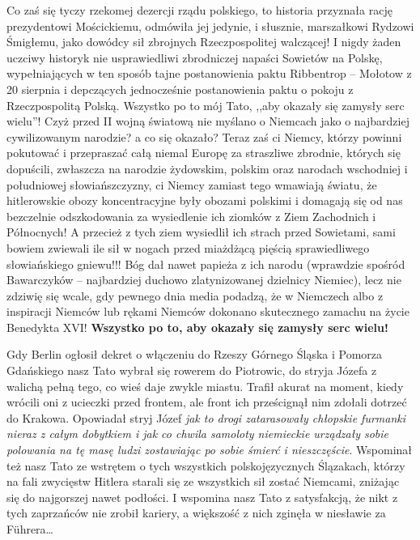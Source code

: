 Co zaś się tyczy rzekomej dezercji rządu polskiego, to historia przyznała rację prezydentowi Mościckiemu, odmówiła jej jedynie, i słusznie, marszałkowi Rydzowi Śmigłemu, jako dowódcy sił zbrojnych Rzeczpospolitej walczącej! I nigdy żaden uczciwy historyk nie usprawiedliwi zbrodniczej napaści Sowietów na Polskę, wypełniających w ten sposób tajne postanowienia paktu Ribbentrop -- Mołotow z 20 sierpnia i depczących jednocześnie postanowienia paktu o pokoju z Rzeczpospolitą Polską. Wszystko po to mój Tato, ,,aby okazały się zamysły serc wielu''! Czyż przed II wojną światową nie myślano o Niemcach jako o najbardziej cywilizowanym narodzie? a co się okazało? Teraz zaś ci Niemcy, którzy powinni pokutować i przepraszać całą niemal Europę za straszliwe zbrodnie, których się dopuścili, zwłaszcza na narodzie żydowskim, polskim oraz narodach wschodniej i południowej słowiańszczyzny, ci Niemcy zamiast tego wmawiają światu, że hitlerowskie obozy koncentracyjne były obozami polskimi i domagają się od nas bezczelnie odszkodowania za wysiedlenie ich ziomków z Ziem Zachodnich i Północnych! A przecież z tych ziem wysiedlił ich strach przed Sowietami, sami bowiem zwiewali ile sił w nogach przed miażdżącą pięścią sprawiedliwego słowiańskiego gniewu!!! Bóg dał nawet papieża z ich narodu (wprawdzie spośród Bawarczyków – najbardziej duchowo zlatynizowanej dzielnicy Niemiec), lecz nie zdziwię się wcale, gdy pewnego dnia media podadzą, że w Niemczech albo z inspiracji Niemców lub rękami Niemców dokonano skutecznego zamachu na życie Benedykta XVI! \textbf{Wszystko po to, aby okazały się zamysły serc wielu!}

Gdy Berlin ogłosił dekret o włączeniu do Rzeszy Górnego Śląska i Pomorza Gdańskiego nasz Tato wybrał się rowerem do Piotrowic, do stryja Józefa z walichą pełną tego, co wieś daje zwykle miastu. Trafił akurat na moment, kiedy wrócili oni z ucieczki przed frontem, ale front ich prześcignął nim zdołali dotrzeć do Krakowa. Opowiadał stryj Józef \textit{jak to drogi zatarasowały chłopskie furmanki nieraz z całym dobytkiem i jak co chwila samoloty niemieckie urządzały sobie polowania na tę masę ludzi zostawiając po sobie śmierć i nieszczęście}. Wspominał też nasz Tato ze wstrętem o tych wszystkich polskojęzycznych Ślązakach, którzy na fali zwycięstw Hitlera starali się ze wszystkich sił zostać Niemcami, zniżając się do najgorszej nawet podłości. I wspomina nasz Tato z satysfakcją, że nikt z tych zaprzańców nie zrobił kariery, a większość z nich zginęła w niesławie za Führera\ldots


